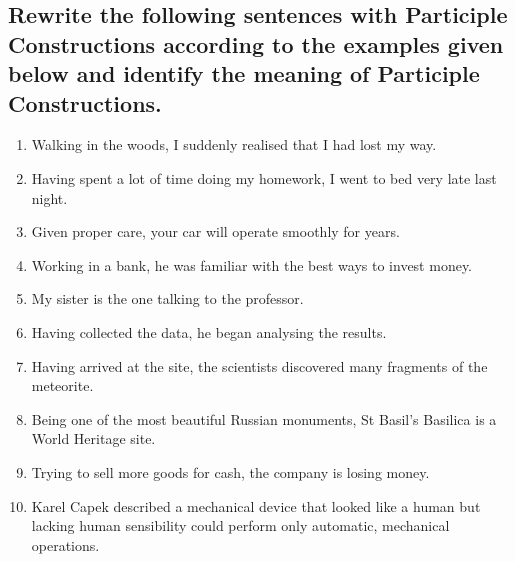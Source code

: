 \subsection*{Rewrite the following sentences with Participle Constructions according
      to the examples given below and identify the meaning of Participle Constructions.}
\begin{enumerate}
      \item Walking in the woods, I suddenly realised that I had lost my way.
      \item Having spent a lot of time doing my homework, I went to bed very late last
            night.
      \item Given proper care, your car will operate smoothly for years.
      \item Working in a bank, he was familiar with the best ways to invest money.
      \item My sister is the one talking to the professor.
      \item Having collected the data, he began analysing the results.
      \item Having arrived at the site, the scientists discovered many fragments of the
            meteorite.
      \item Being one of the most beautiful Russian monuments, St Basil’s Basilica is a
            World Heritage site.
      \item Trying to sell more goods for cash, the company is losing money.
      \item Karel Capek described a mechanical device that looked like a human but
            lacking human sensibility could perform only automatic, mechanical
            operations.
\end{enumerate}


